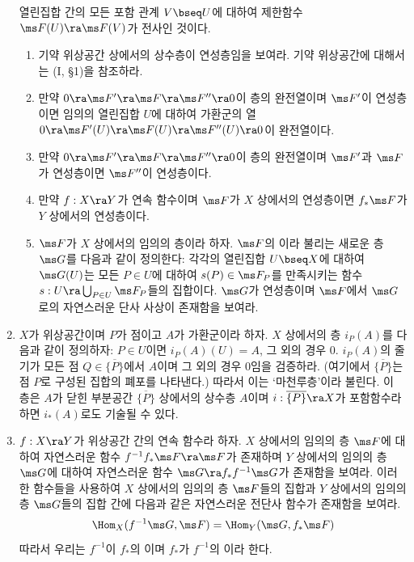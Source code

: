\begin{enumerate}[label=\tb{1.\arabic*.},itemindent=0mm,itemsep=2mm]
	열린집합 간의 모든 포함 관계 $V\bseq U$에 대하여 제한함수 $\ms F(U)\ra\ms F(V)$가 전사인 것이다.
	\begin{enumerate}[label=(\alph*)]
	\item 기약 위상공간 상에서의 상수층이 연성층임을 보여라. 기약 위상공간에 대해서는 (I, \S 1)을 참조하라.
	\item 만약 $0\ra\ms F'\ra\ms F\ra\ms F''\ra 0$이 층의 완전열이며 $\ms F'$이 연성층이면 임의의 열린집합 $U$에 대하여
	가환군의 열 $0\ra\ms F'(U)\ra\ms F(U)\ra\ms F''(U)\ra 0$이 완전열이다.
	\item 만약 $0\ra\ms F'\ra\ms F\ra\ms F''\ra 0$이 층의 완전열이며 $\ms F'$과 $\ms F$가 연성층이면 $\ms F''$이 연성층이다.
	\item 만약 $f:X\ra Y$가 연속 함수이며 $\ms F$가 $X$ 상에서의 연성층이면 $f_*\ms F$가 $Y$ 상에서의 연성층이다.
	\item $\ms F$가 $X$ 상에서의 임의의 층이라 하자.
	$\ms F$의 이라 불리는 새로운 층 $\ms G$를 다음과 같이 정의한다:
	각각의 열린집합 $U\bseq X$에 대하여 $\ms G(U)$는 모든 $P\in U$에 대하여 $s(P)\in\ms F_P$를 만족시키는
	함수 $s:U\ra\bigcup_{P\in U}\ms F_P$들의 집합이다.
	$\ms G$가 연성층이며 $\ms F$에서 $\ms G$로의 자연스러운 단사 사상이 존재함을 보여라.
	\end{enumerate}
	\item {} $X$가 위상공간이며 $P$가 점이고 $A$가 가환군이라 하자.
	$X$ 상에서의 층 $i_P(A)$를 다음과 같이 정의하자: $P\in U$이면 $i_P(A)(U)=A$, 그 외의 경우 $0$.
	$i_P(A)$의 줄기가 모든 점 $Q\in\overline{\{P\}}$에서 $A$이며 그 외의 경우 $0$임을 검증하라.
	(여기에서 $\overline{\{P\}}$는 점 $P$로 구성된 집합의 폐포를 나타낸다.) 따라서 이는 `마천루층'이라 불린다.
	이 층은 $A$가 닫힌 부분공간 $\overline{\{P\}}$ 상에서의 상수층 $A$이며
	$i:\overline{\{P\}}\ra X$가 포함함수라 하면 $i_*(A)$로도 기술될 수 있다.
	\item {} $f:X\ra Y$가 위상공간 간의 연속 함수라 하자.
	$X$ 상에서의 임의의 층 $\ms F$에 대하여 자연스러운 함수 $f^{-1}f_*\ms F\ra\ms F$가 존재하며
	$Y$ 상에서의 임의의 층 $\ms G$에 대하여 자연스러운 함수 $\ms G\ra f_*f^{-1}\ms G$가 존재함을 보여라.
	이러한 함수들을 사용하여 $X$ 상에서의 임의의 층 $\ms F$들의 집합과 $Y$ 상에서의 임의의 층 $\ms G$들의 집합 간에
	다음과 같은 자연스러운 전단사 함수가 존재함을 보여라.
	$$\Hom_X(f^{-1}\ms G,\ms F)=\Hom_Y(\ms G,f_*\ms F)$$
	따라서 우리는 $f^{-1}$이 $f_*$의 이며 $f_*$가 $f^{-1}$의 이라 한다.

\end{enumerate}
